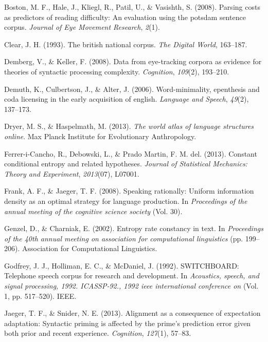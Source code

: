 \documentclass[10pt, letterpaper]{article}
\begin{document}
\leavevmode\hypertarget{ref-boston2008}{}%
Boston, M. F., Hale, J., Kliegl, R., Patil, U., \& Vasishth, S. (2008).
Parsing costs as predictors of reading difficulty: An evaluation using
the potsdam sentence corpus. \emph{Journal of Eye Movement Research},
\emph{2}(1).

\leavevmode\hypertarget{ref-clear1993}{}%
Clear, J. H. (1993). The british national corpus. \emph{The Digital
World}, 163--187.

\leavevmode\hypertarget{ref-demberg2008}{}%
Demberg, V., \& Keller, F. (2008). Data from eye-tracking corpora as
evidence for theories of syntactic processing complexity.
\emph{Cognition}, \emph{109}(2), 193--210.

\leavevmode\hypertarget{ref-demuth2006}{}%
Demuth, K., Culbertson, J., \& Alter, J. (2006). Word-minimality,
epenthesis and coda licensing in the early acquisition of english.
\emph{Language and Speech}, \emph{49}(2), 137--173.

\leavevmode\hypertarget{ref-dryer2013}{}%
Dryer, M. S., \& Haspelmath, M. (2013). \emph{The world atlas of
language structures online}. Max Planck Institute for Evolutionary
Anthropology.

\leavevmode\hypertarget{ref-ferrer-i-cancho2013}{}%
Ferrer-i-Cancho, R., Debowski, L., \& Prado Martin, F. M. del. (2013).
Constant conditional entropy and related hypotheses. \emph{Journal of
Statistical Mechanics: Theory and Experiment}, \emph{2013}(07), L07001.

\leavevmode\hypertarget{ref-frank2008}{}%
Frank, A. F., \& Jaeger, T. F. (2008). Speaking rationally: Uniform
information density as an optimal strategy for language production. In
\emph{Proceedings of the annual meeting of the cognitive science
society} (Vol. 30).

\leavevmode\hypertarget{ref-genzel2002}{}%
Genzel, D., \& Charniak, E. (2002). Entropy rate constancy in text. In
\emph{Proceedings of the 40th annual meeting on association for
computational linguistics} (pp. 199--206). Association for Computational
Linguistics.

\leavevmode\hypertarget{ref-godfrey1992}{}%
Godfrey, J. J., Holliman, E. C., \& McDaniel, J. (1992). SWITCHBOARD:
Telephone speech corpus for research and development. In
\emph{Acoustics, speech, and signal processing, 1992. ICASSP-92., 1992
ieee international conference on} (Vol. 1, pp. 517--520). IEEE.

\leavevmode\hypertarget{ref-jaeger2013}{}%
Jaeger, T. F., \& Snider, N. E. (2013). Alignment as a consequence of
expectation adaptation: Syntactic priming is affected by the prime's
prediction error given both prior and recent experience.
\emph{Cognition}, \emph{127}(1), 57--83.
\end{document}
